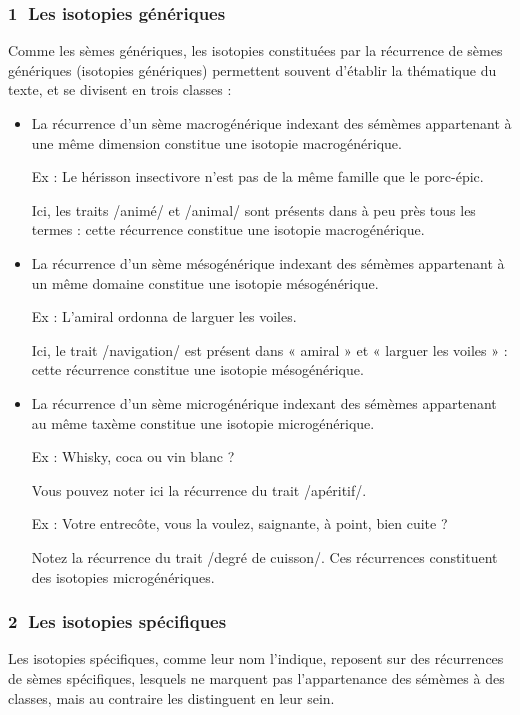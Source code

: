 \subsubsection*{\textcircled{\scriptsize 1} Les isotopies génériques}
Comme les sèmes génériques, les isotopies constituées par la récurrence de sèmes génériques (isotopies génériques) permettent souvent d’établir la thématique du texte, et se divisent en trois classes :
\begin{itemize}
\item La récurrence d’un sème macrogénérique indexant des sémèmes appartenant à une même dimension constitue une isotopie macrogénérique.

Ex : Le hérisson insectivore n’est pas de la même famille que le porc-épic.

Ici, les traits /animé/ et /animal/ sont présents dans à peu près tous les termes : cette récurrence constitue une isotopie macrogénérique.
\item La récurrence d’un sème mésogénérique indexant des sémèmes appartenant à un même domaine constitue une isotopie mésogénérique.

Ex : L’amiral ordonna de larguer les voiles.

Ici, le trait /navigation/ est présent dans « amiral » et « larguer les voiles » : cette récurrence constitue une isotopie mésogénérique.
\item La récurrence d’un sème microgénérique indexant des sémèmes appartenant au même taxème constitue une isotopie microgénérique.

Ex : Whisky, coca ou vin blanc ?

Vous pouvez noter ici la récurrence du trait /apéritif/.

Ex : Votre entrecôte, vous la voulez, saignante, à point, bien cuite ?

Notez la récurrence du trait /degré de cuisson/. Ces récurrences constituent des isotopies microgénériques.
\end{itemize}

\subsubsection*{\textcircled{\scriptsize 2} Les isotopies spécifiques}
Les isotopies spécifiques, comme leur nom l’indique, reposent sur des récurrences de sèmes spécifiques, lesquels ne marquent pas l’appartenance des sémèmes à des classes, mais au contraire les distinguent en leur sein.

